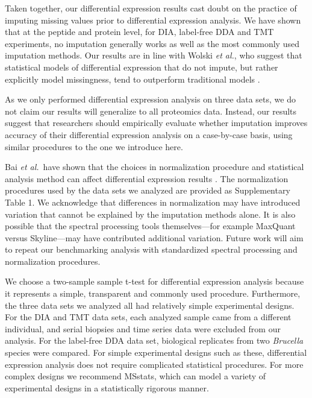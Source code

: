 \documentclass{article}
\begin{document}
Taken together, our differential expression results cast doubt on the practice of imputing missing values prior to differential expression analysis. We have shown that at the peptide and protein level, for DIA, label-free DDA and TMT experiments, no imputation generally works as well as the most commonly used imputation methods. Our results are in line with Wolski \textit{et al.}, who suggest that statistical models of differential expression that do not impute, but rather explicitly model missingness, tend to outperform traditional models \cite{prolfqua}.

As we only performed differential expression analysis on three data sets, we do not claim our results will generalize to all proteomics data. Instead, our results suggest that researchers should empirically evaluate whether imputation improves accuracy of their differential expression analysis on a case-by-case basis, using similar procedures to the one we introduce here.

Bai \textit{et al.}\ have shown that the choices in normalization procedure and statistical analysis method can affect differential expression results \cite{bai-2023}. The normalization procedures used by the data sets we analyzed are provided as Supplementary Table 1. We acknowledge that differences in normalization may have introduced variation that cannot be explained by the imputation methods alone. It is also possible that the spectral processing tools themselves---for example MaxQuant versus Skyline---may have contributed additional variation. Future work will aim to repeat our benchmarking analysis with standardized spectral processing and normalization procedures.

We choose a two-sample sample t-test for differential expression analysis because it represents a simple, transparent and commonly used procedure\cite{brunner-2022, pxd007683, pxd006348, pxd016079}. Furthermore, the three data sets we analyzed all had relatively simple experimental designs. For the DIA\cite{smtg-maccoss} and TMT\cite{CPTAC-S047} data sets, each analyzed sample came from a different individual, and serial biopsies and time series data were excluded from our analysis. For the label-free DDA data set\cite{pxd006348}, biological replicates from two \textit{Brucella} species were compared. For simple experimental designs such as these, differential expression analysis does not require complicated statistical procedures. 
For more complex designs we recommend MSstats, which can model a variety of experimental designs in a statistically rigorous manner\cite{ms-stats}.
\end{document}
